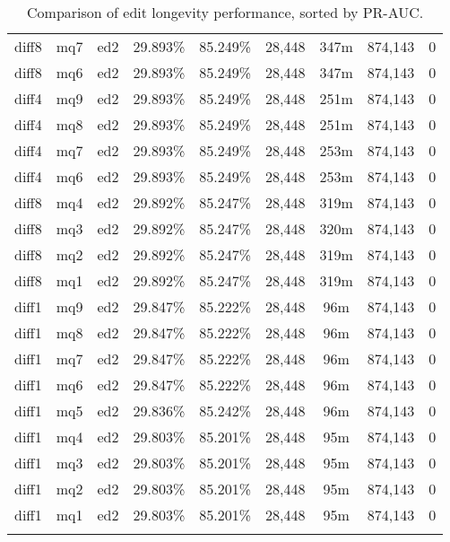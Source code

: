 \begin{landscape}
\begin{longtable}{|c|c|c||c|c||c|c|c|c|}
diff8 & mq7 & ed2 & 29.893\% & 85.249\% & 28,448 & 347m & 874,143 & 0 \\
diff8 & mq6 & ed2 & 29.893\% & 85.249\% & 28,448 & 347m & 874,143 & 0 \\
diff4 & mq9 & ed2 & 29.893\% & 85.249\% & 28,448 & 251m & 874,143 & 0 \\
diff4 & mq8 & ed2 & 29.893\% & 85.249\% & 28,448 & 251m & 874,143 & 0 \\
diff4 & mq7 & ed2 & 29.893\% & 85.249\% & 28,448 & 253m & 874,143 & 0 \\
diff4 & mq6 & ed2 & 29.893\% & 85.249\% & 28,448 & 253m & 874,143 & 0 \\
diff8 & mq4 & ed2 & 29.892\% & 85.247\% & 28,448 & 319m & 874,143 & 0 \\
diff8 & mq3 & ed2 & 29.892\% & 85.247\% & 28,448 & 320m & 874,143 & 0 \\
diff8 & mq2 & ed2 & 29.892\% & 85.247\% & 28,448 & 319m & 874,143 & 0 \\
diff8 & mq1 & ed2 & 29.892\% & 85.247\% & 28,448 & 319m & 874,143 & 0 \\
diff1 & mq9 & ed2 & 29.847\% & 85.222\% & 28,448 & 96m & 874,143 & 0 \\
diff1 & mq8 & ed2 & 29.847\% & 85.222\% & 28,448 & 96m & 874,143 & 0 \\
diff1 & mq7 & ed2 & 29.847\% & 85.222\% & 28,448 & 96m & 874,143 & 0 \\
diff1 & mq6 & ed2 & 29.847\% & 85.222\% & 28,448 & 96m & 874,143 & 0 \\
diff1 & mq5 & ed2 & 29.836\% & 85.242\% & 28,448 & 96m & 874,143 & 0 \\
diff1 & mq4 & ed2 & 29.803\% & 85.201\% & 28,448 & 95m & 874,143 & 0 \\
diff1 & mq3 & ed2 & 29.803\% & 85.201\% & 28,448 & 95m & 874,143 & 0 \\
diff1 & mq2 & ed2 & 29.803\% & 85.201\% & 28,448 & 95m & 874,143 & 0 \\
diff1 & mq1 & ed2 & 29.803\% & 85.201\% & 28,448 & 95m & 874,143 & 0 \\
\hline
  \caption{Comparison of edit longevity performance,
    sorted by PR-AUC.}
  \label{tab:editshoutO}
  \end{longtable}
\end{landscape}
\clearpage
